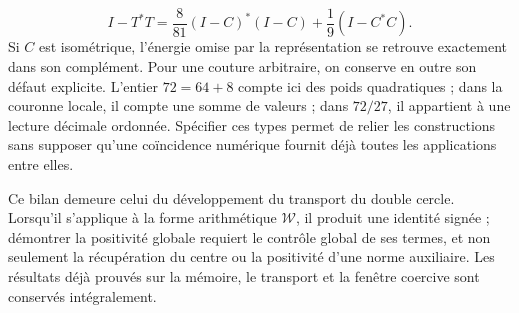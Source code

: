 \[
I-T^*T=\frac8{81}(I-C)^*(I-C)+\frac19(I-C^*C).
\]
Si \(C\) est isométrique, l'énergie omise par la représentation se retrouve exactement dans son complément. Pour une couture arbitraire, on conserve en outre son défaut explicite. L'entier \(72=64+8\) compte ici des poids quadratiques ; dans la couronne locale, il compte une somme de valeurs ; dans \(72/27\), il appartient à une lecture décimale ordonnée. Spécifier ces types permet de relier les constructions sans supposer qu'une coïncidence numérique fournit déjà toutes les applications entre elles.

Ce bilan demeure celui du développement du transport du double cercle. Lorsqu'il s'applique à la forme arithmétique \(\mathscr W\), il produit une identité signée ; démontrer la positivité globale requiert le contrôle global de ses termes, et non seulement la récupération du centre ou la positivité d'une norme auxiliaire. Les résultats déjà prouvés sur la mémoire, le transport et la fenêtre coercive sont conservés intégralement.
